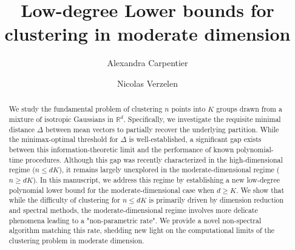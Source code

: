 \documentclass{article}
\title{Low-degree Lower bounds for clustering in moderate dimension}
\author[1]{Alexandra Carpentier}
\author[2]{Nicolas Verzelen}
\affil[1]{\textit{\scriptsize{Institut für Mathematik, Universität Potsdam, Germany.}}}
\affil[2]{\textit{\scriptsize{INRAE, MISTEA, Univ. Montpellier, Montpellier, France}} }
\begin{document}
\maketitle

\begin{abstract}
We study the fundamental problem of clustering $n$ points into $K$ groups drawn from a mixture of isotropic Gaussians in $\mathbb{R}^d$. Specifically, we investigate the requisite minimal distance $\Delta$ between mean vectors to partially recover the underlying partition. While the minimax-optimal threshold for $\Delta$ is well-established, a significant gap exists between this information-theoretic limit and the performance of known polynomial-time procedures. Although this gap was recently characterized in the high-dimensional regime ($n \leq dK$), it remains largely unexplored in the moderate-dimensional regime ($n \geq dK$). In this manuscript, we address this regime by establishing a new low-degree polynomial lower bound for the moderate-dimensional case when $d \geq K$. We show that while the difficulty of clustering for $n \leq dK$ is primarily driven by dimension reduction and spectral methods, the moderate-dimensional regime involves more delicate phenomena leading to a "non-parametric rate". We provide a novel non-spectral algorithm matching this rate, shedding new light on the computational limits of the clustering problem in moderate dimension.
\end{abstract}
\end{document}

